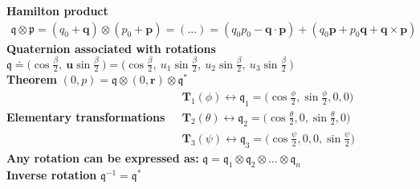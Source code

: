 \documentclass[a4paper, 12pt]{article}
\begin{document}
{{\noindent
\textbf{Hamilton product}
$\begin{aligned}
    \mathfrak{q} \otimes \mathfrak{p} = 
    (q_0+\mathbf{q}) \otimes (p_0+\mathbf{p}) = (...)
    = (q_0p_0-\mathbf{q}\cdot\mathbf{p})+(q_0\mathbf{p}+p_0\mathbf{q}+\mathbf{q}\times\mathbf{p})
\end{aligned}$\\

\noindent
\textbf{Quaternion associated with rotations}
$\mathfrak{q} \doteq 
\bigg( 
    \cos\frac{\beta}{2}, \
    \mathbf{u} \sin\frac{\beta}{2} \
\bigg)=
\bigg( 
    \cos\frac{\beta}{2}, \
    u_1 \sin\frac{\beta}{2}, \
    u_2 \sin\frac{\beta}{2},\
    u_3 \sin\frac{\beta}{2} \
\bigg)$\\
\noindent
\textbf{Theorem } $ (0,p) = \mathfrak{q} \otimes (0, \mathbf{r}) \otimes \mathfrak{q}^*$\\
\noindent
\textbf{Elementary transformations}
$
\begin{aligned}
    &\mathbf{T}_1(\phi) \longleftrightarrow
    \mathfrak{q}_1 = \bigg(\cos \frac{\phi}{2}, \sin \frac{\phi}{2}, 0, 0 \bigg)\\
    &\mathbf{T}_2(\theta) \longleftrightarrow 
    \mathfrak{q}_2=\bigg(\cos \frac{\theta}{2}, 0, \sin \frac{\theta}{2}, 0 \bigg)\\
    &\mathbf{T}_3(\psi) \longleftrightarrow 
    \mathfrak{q}_3=\bigg(\cos \frac{\psi}{2}, 0, 0, \sin\frac{\psi}{2} \bigg)
\end{aligned}
$\\
\textbf{Any rotation can be expressed as: }
$ \mathfrak{q} = 
\mathfrak{q}_1 \otimes
\mathfrak{q}_2 \otimes
\dots \otimes
\mathfrak{q}_n$ \\

\noindent
\textbf{Inverse rotation} 
$ \mathfrak{q}^{-1} = \mathfrak{q}^*$

}}
\end{document}
